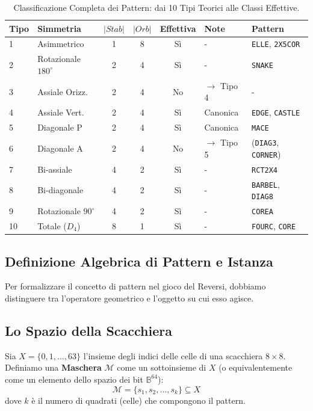 \begin{table}[h]
\centering
\caption{Classificazione Completa dei Pattern: dai 10 Tipi Teorici alle Classi Effettive.}
\label{tab:pattern_classification}
\begin{tabular}{llcccll}
\hline
\textbf{Tipo} & \textbf{Simmetria} & \textbf{$|Stab|$} & \textbf{$|Orb|$} & \textbf{Effettiva} & \textbf{Note} & \textbf{Pattern} \\ \hline
1 & Asimmetrico & 1 & 8 & Sì & - & \texttt{ELLE}, \texttt{2X5COR} \\
2 & Rotazionale $180^\circ$ & 2 & 4 & Sì & - & \texttt{SNAKE} \\
3 & Assiale Orizz. & 2 & 4 & No & $\to$ Tipo 4 & - \\
4 & Assiale Vert. & 2 & 4 & Sì & Canonica & \texttt{EDGE}, \texttt{CASTLE} \\
5 & Diagonale P & 2 & 4 & Sì & Canonica & \texttt{MACE} \\
6 & Diagonale A & 2 & 4 & No & $\to$ Tipo 5 & (\texttt{DIAG3}, \texttt{CORNER}) \\
7 & Bi-assiale & 4 & 2 & Sì & - & \texttt{RCT2X4} \\
8 & Bi-diagonale & 4 & 2 & Sì & - & \texttt{BARBEL}, \texttt{DIAG8} \\
9 & Rotazionale $90^\circ$ & 4 & 2 & Sì & - & \texttt{COREA} \\
10 & Totale ($D_4$) & 8 & 1 & Sì & - & \texttt{FOURC}, \texttt{CORE} \\
\hline
\end{tabular}
\end{table}

\subsection{Definizione Algebrica di Pattern e Istanza}

Per formalizzare il concetto di pattern nel gioco del Reversi, dobbiamo distinguere tra l'operatore geometrico e l'oggetto su cui esso agisce.

\subsection{Lo Spazio della Scacchiera}
Sia $X = \{0, 1, \dots, 63\}$ l'insieme degli indici delle celle di una scacchiera $8 \times 8$. Definiamo una \textbf{Maschera} $\mathcal{M}$ come un sottoinsieme di $X$ (o equivalentemente come un elemento dello spazio dei bit $\mathbb{B}^{64}$):
\begin{equation}
    \mathcal{M} = \{s_1, s_2, \dots, s_k\} \subseteq X
\end{equation}
dove $k$ è il numero di quadrati (celle) che compongono il pattern.

